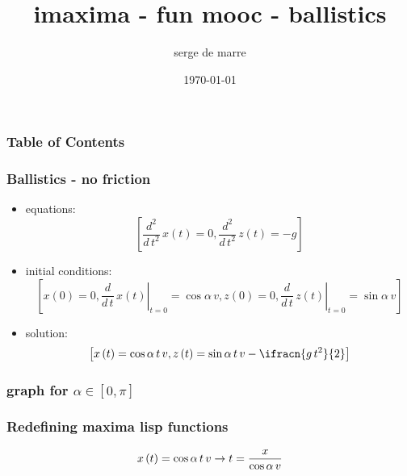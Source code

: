 \documentclass[10pt,xcolor=dvipsnames]{beamer}
\title{imaxima - fun mooc - ballistics}
\author{serge de marre}
\date{\today}
\begin{document}
\newcommand{\ifracd}[2]{\frac{#1}{#2}}
\begin{frame}
  \titlepage
\end{frame}

\begin{frame}
  \frametitle{Table of Contents}
  \tableofcontents
\end{frame}

\begin{frame}
  \frametitle{Ballistics - no friction}
  \begin{itemize}
  \item equations:
$$\left[ \ifracd{d^2}{d\,t^2}\,x\left(t\right)=0 , \ifracd{d^2}{d\,t^2}\,z\left(t\right)=-g \right] $$
  \item initial conditions:
$$\left[ x\left(0\right)=0 ,  \left.\ifracd{d}{d\,t}\,x
 \left(t\right)\right|_{t=0}=\cos \alpha\,v , z\left(0
 \right)=0 , \left.\ifracd{d}{d\,t}\,z\left(t\right)
 \right|_{t=0}=\sin \alpha\,v \right] $$
  \item solution:
$$\left[ x\left(t\right)=\cos \alpha\,t\,v , \linebreak[0]z\left(t
 \right)=\sin \alpha\,t\,v-\ifracn{g\,t^2}{2} \right] $$
  \end{itemize}
\end{frame}

\begin{frame}
  \frametitle{graph for $\alpha \in [0,\pi]$}
\end{frame}



\begin{frame}
  \frametitle{Redefining maxima lisp functions}
$$ x\left(t\right)=\cos \alpha\,t\,v \rightarrow \linebreak[0]t=\ifracd{x
 }{\cos \alpha\,v} $$
\end{frame}
\end{document}
